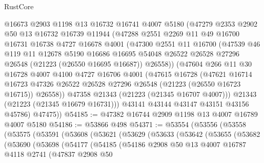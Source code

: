 \begin{lexlean}{RustCore}
\begin{coremodule}
        @16673
        @2903
        @1198
        @13
        @16732
        @16741
        @4007
        @5180
        (@47279
          @2353
          @2902
          @50
          @13
          @16732
          @16739
          @11944
          (@47288
            @2551
            @2269
            @11
            @49
            @16700
            @16731
            @16738
            @4727
            @16678
            @4001
            (@47300
              @2551
              @11
              @16700
              (@47539
                @46
                @119
                @11
                @12678
                @5190
                @16686
                @16695
                @54048
                @26522
                @26528
                @27296
                @26548
                (@21223 (@26550 @16695 @16687))
                @26558))
            (@47604
              @266
              @11
              @30
              @16728
              @4007
              @4100
              @4727
              @16706
              @4001
              (@47615
                @16728
                (@47621
                  @16714
                  @16723
                  @47326
                  @26522
                  @26528
                  @27296
                  @26548
                  (@21223 (@26550 @16723 @16715))
                  @26558))
              @47358
              @21343
              (@21223 (@21345 @16707 @4007)))
            @21343
            (@21223 (@21345 @16679 @16731)))
          @43141
          @43144
          @43147
          @43151
          @43156
          @45786)
        @47475))
@54185 := @47382 @16744 @2909 @1198 @13 @4007 @16789 @4007 @5180
@54186 := @53866 @498
@54371 := @53554
    (@53556
      (@53558
        (@53575
          (@53591
            (@53608
              (@53621
                (@53629
                  (@53633
                    (@53642
                      (@53655
                        (@53682
                          (@53690
                            (@53698
                              (@54177
                                (@54185
                                  (@54186
                                    @2908
                                    @50
                                    @13
                                    @4007
                                    @16787
                                    @4118
                                    @2741
                                    (@47837
                                      @2908
                                      @50

\end{coremodule}
\end{lexlean}
